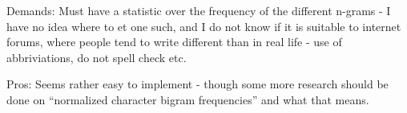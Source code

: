 

\cite{nr2} 
Demands:
Must have a statistic over the frequency of the different n-grams - I have no idea where to et one such, and I do not know if it is suitable to internet forums, where people tend to write different than in real life - use of abbriviations, do not spell check etc.

Pros: 
Seems rather easy to implement - though some more research should be done on ``normalized character bigram frequencies'' and what that means.

\cite{nr3}
